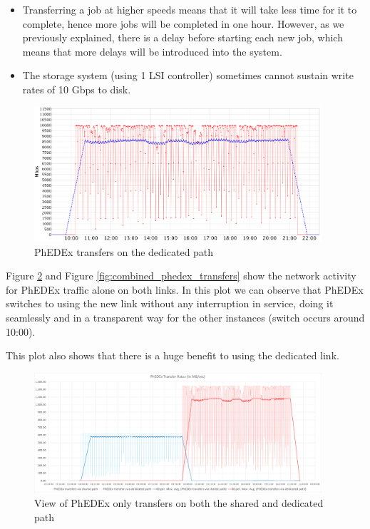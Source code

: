 \begin{itemize}
  \item Transferring a job at higher speeds means that it will take less time for
  it to complete, hence more jobs will be completed in one hour. However, as
  we previously explained, there is a delay before starting each new job, which
  means that more delays will be introduced into the system.
  \item The storage system (using 1 LSI controller) sometimes cannot sustain
  write rates of 10 Gbps to disk.
\end{itemize}


\begin{figure}[h]
  \centering
  \includegraphics[width=0.95\textwidth]{Figures/FileDownload_Solo_path.png}
  \caption{PhEDEx transfers on the dedicated path}
    \label{fig:solo_transfers}
\end{figure} 

Figure \ref{fig:combined_transfers} and Figure \ref{fig:combined_phedex_transfers} show
the  network activity for PhEDEx traffic alone on both links. 
In this plot we can observe that PhEDEx switches to using the
new link without any interruption in service, doing it seamlessly and in a 
transparent way for the other instances (switch occurs around 10:00).

This plot also shows that there is a huge benefit to using the dedicated link.

\begin{figure}[h]
  \centering
  \includegraphics[width=0.95\textwidth]{Figures/FileDownload_All_paths.png}
  \caption{View of PhEDEx only transfers on both the shared and dedicated path}
  \label{fig:combined_transfers}
\end{figure} 

